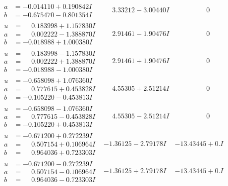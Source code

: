 \documentclass[1p]{elsarticle_modified}
\theoremstyle{definition}
\begin{document}
$$\begin{array}{c|c|c}
\begin{aligned}
a &= -0.014110 + 0.190842 I \\
b &= -0.675470 - 0.801354 I\end{aligned}
 & \phantom{-}3.33212 - 3.00440 I & \phantom{-0.000000 } 0 \\ \hline\begin{aligned}
u &= \phantom{-}0.183998 + 1.157830 I \\
a &= \phantom{-}0.002222 - 1.388870 I \\
b &= -0.018988 + 1.000380 I\end{aligned}
 & \phantom{-}2.91461 - 1.90476 I & \phantom{-0.000000 } 0 \\ \hline\begin{aligned}
u &= \phantom{-}0.183998 - 1.157830 I \\
a &= \phantom{-}0.002222 + 1.388870 I \\
b &= -0.018988 - 1.000380 I\end{aligned}
 & \phantom{-}2.91461 + 1.90476 I & \phantom{-0.000000 } 0 \\ \hline\begin{aligned}
u &= -0.658098 + 1.076360 I \\
a &= \phantom{-}0.777615 + 0.453828 I \\
b &= -0.105220 - 0.453813 I\end{aligned}
 & \phantom{-}4.55305 + 2.51214 I & \phantom{-0.000000 } 0 \\ \hline\begin{aligned}
u &= -0.658098 - 1.076360 I \\
a &= \phantom{-}0.777615 - 0.453828 I \\
b &= -0.105220 + 0.453813 I\end{aligned}
 & \phantom{-}4.55305 - 2.51214 I & \phantom{-0.000000 } 0 \\ \hline\begin{aligned}
u &= -0.671200 + 0.272239 I \\
a &= \phantom{-}0.507154 + 0.106964 I \\
b &= \phantom{-}0.964036 + 0.723303 I\end{aligned}
 & -1.36125 - 2.79178 I & -13.43445 + 0. I\phantom{ +0.000000I} \\ \hline\begin{aligned}
u &= -0.671200 - 0.272239 I \\
a &= \phantom{-}0.507154 - 0.106964 I \\
b &= \phantom{-}0.964036 - 0.723303 I\end{aligned}
 & -1.36125 + 2.79178 I & -13.43445 + 0. I\phantom{ +0.000000I} \\ \hline\begin{aligned}

\end{aligned}
\end{array}$$
\end{document}
